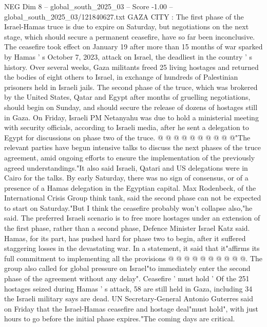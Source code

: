 \begin{textsample}{NEG Dim 8 – global\_south\_2025\_03 – Score -1.00 – global\_south\_2025\_03/121840627.txt}  \label{ex:f8_neg_299}
GAZA CITY : The first phase of the Israel-Hamas truce is due to expire on Saturday, but negotiations on the next stage, which should secure a permanent ceasefire, have so far been inconclusive.
The ceasefire took effect on January 19 after more than 15 months of war sparked by Hamas ' s October 7, 2023, attack on Israel, the deadliest in the country ' s history.
Over several weeks, Gaza militants freed 25 living hostages and returned the bodies of eight others to Israel, in exchange of hundreds of Palestinian prisoners held in Israeli jails.
The second phase of the truce, which was brokered by the United States, Qatar and Egypt after months of gruelling negotiations, should begin on Sunday, and should secure the release of dozens of hostages still in Gaza.
On Friday, Israeli PM Netanyahu was due to hold a ministerial meeting with security officials, according to Israeli media, after he sent a delegation to Egypt for discussions on phase two of the truce. @ @ @ @ @ @ @ @ @ @"The relevant parties have begun intensive talks to discuss the next phases of the truce agreement, amid ongoing efforts to ensure the implementation of the previously agreed understandings."It also said Israeli, Qatari and US delegations were in Cairo for the talks.
By early Saturday, there was no sign of consensus, or of a presence of a Hamas delegation in the Egyptian capital.
Max Rodenbeck, of the International Crisis Group think tank, said the second phase can not be expected to start on Saturday."But I think the ceasefire probably won't collapse also,"he said.
The preferred Israeli scenario is to free more hostages under an extension of the first phase, rather than a second phase, Defence Minister Israel Katz said.
Hamas, for its part, has pushed hard for phase two to begin, after it suffered staggering losses in the devastating war.
In a statement, it said that it"affirms its full commitment to implementing all the provisions @ @ @ @ @ @ @ @ @ @.
The group also called for global pressure on Israel"to immediately enter the second phase of the agreement without any delay".
Ceasefire ' must hold ' Of the 251 hostages seized during Hamas ' s attack, 58 are still held in Gaza, including 34 the Israeli military says are dead.
UN Secretary-General Antonio Guterres said on Friday that the Israel-Hamas ceasefire and hostage deal"must hold", with just hours to go before the initial phase expires."The coming days are critical.

\end{textsample}
